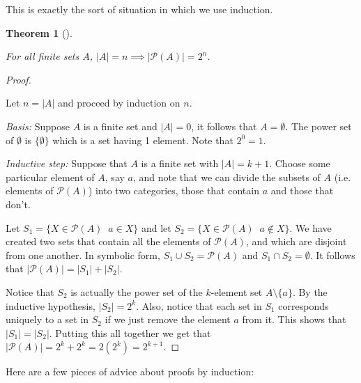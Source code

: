 \documentclass[10pt,]{book}
\theoremstyle{plain}
\newtheorem{theorem}{Theorem}[section]
\theoremstyle{definition}
\theoremstyle{definition}
\numberwithin{equation}{section}
\newcommand{\suchthat}{\;  \;}
\begin{document}
    This is exactly the sort of situation in which we use induction.
\begin{theorem}[{}]\label{theorem-15}

        For all finite sets \(A\), \(\displaystyle |A| = n \implies  |{\mathcal P}(A)| = 2^n\).
\end{theorem}
\begin{proof}\hypertarget{proof-26}{}

      Let \(n = |A|\) and proceed by induction on \(n\).
\par

      \emph{Basis:} Suppose \(A\) is a finite set and \(|A| = 0\), it follows
      that \(A = \emptyset\). The power set of \(\emptyset\) is \(\{ \emptyset \}\)
      which is a set having 1 element. Note that \(2^0 = 1\).
\par

      \emph{Inductive step:} Suppose that \(A\) is a finite set with \(|A| = k+1\). Choose some particular element of \(A\), say \(a\), and note that
      we can divide the subsets of \(A\) (i.e. elements of \({\mathcal P}(A)\)) into
      two categories, those that contain \(a\) and those that don't.
\par

      Let \(S_1 = \{ X \in {\mathcal P}(A) \suchthat a \in X \}\) and let
      \(S_2 = \{ X \in {\mathcal P}(A) \suchthat a \notin X \}\). We have
      created two sets that contain all the elements of \({\mathcal P}(A)\),
      and which are disjoint from one another. In symbolic form,
      \(S_1 \cup S_2 = {\mathcal P}(A)\) and \(S_1 \cap S_2 = \emptyset\).
      It follows that \(|{\mathcal P}(A)| = |S_1| + |S_2|\).
\par

      Notice that \(S_2\) is actually the power set of the \(k\)-element set
      \(A \setminus \{ a \}\). By the inductive hypothesis, \(|S_2| = 2^k\).
      Also, notice that each set in \(S_1\) corresponds uniquely to a set in
      \(S_2\) if we just remove the element \(a\) from it. This shows that
      \(|S_1| = |S_2|\). Putting this all together we get that
      \(|{\mathcal P}(A)| = 2^k + 2^k = 2(2^k) = 2^{k+1}\).
\end{proof}
\par

  Here are a few pieces
  of advice about proofs by induction:
\end{document}
